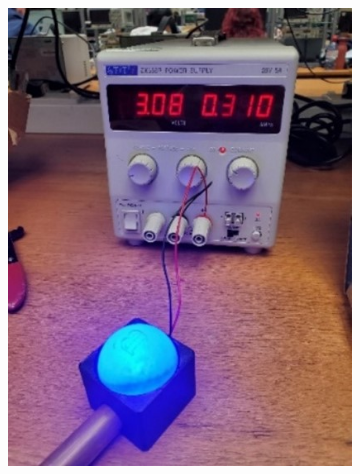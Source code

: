 \begin{figure}
\begin{subfigure}[b]{.45\linewidth}
        \includegraphics[width=\linewidth]{images/led-blue.jpg}
    \end{subfigure}
    \begin{subfigure}[b]{.45\linewidth}

\end{subfigure}
\end{figure}
